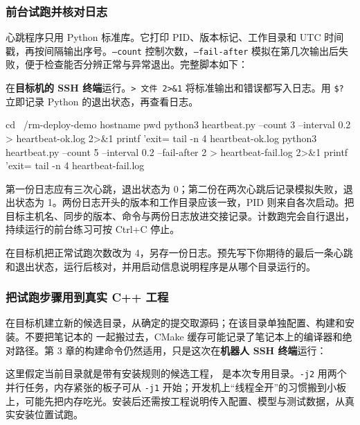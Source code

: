 \subsubsection{前台试跑并核对日志}
\label{sec:deploy-first-log}

心跳程序只用 Python 标准库。它打印 PID、版本标记、工作目录和 UTC 时间戳，再按间隔输出序号。\texttt{--count} 控制次数，\texttt{--fail-after} 模拟在第几次输出后失败，便于检查能否分辨正常与异常退出。完整脚本如下：



\begin{example}
在\textbf{目标机的 SSH 终端}运行。\texttt{> 文件 2>\&1} 将标准输出和错误都写入日志。用 \texttt{\$?} 立即记录 Python 的退出状态，再查看日志。

\begin{tbash}
cd ~/rm-deploy-demo
hostname
pwd
python3 heartbeat.py --count 3 --interval 0.2 > heartbeat-ok.log 2>&1
printf 'exit=%
tail -n 4 heartbeat-ok.log
python3 heartbeat.py --count 5 --interval 0.2 --fail-after 2 > heartbeat-fail.log 2>&1
printf 'exit=%
tail -n 4 heartbeat-fail.log
\end{tbash}

第一份日志应有三次心跳，退出状态为 0；第二份在两次心跳后记录模拟失败，退出状态为 1。两份日志开头的版本和工作目录应该一致，PID 则来自各次启动。把目标主机名、同步的版本、命令与两份日志放进交接记录。计数跑完会自行退出，持续运行的前台练习可按 Ctrl+C 停止。
\end{example}

\begin{exercise}\label{ex:deploy-first-log}
在目标机把正常试跑次数改为 4，另存一份日志。预先写下你期待的最后一条心跳和退出状态，运行后核对，并用启动信息说明程序是从哪个目录运行的。
\end{exercise}

\subsubsection{把试跑步骤用到真实 C++ 工程}

在目标机建立新的候选目录，从确定的提交取源码；在该目录单独配置、构建和安装。不要把笔记本的  一起搬过去，CMake 缓存可能记录了笔记本上的编译器和绝对路径。第 3 章的构建命令仍然适用，只是这次在\textbf{机器人 SSH 终端}运行：
这里假定当前目录就是带有安装规则的候选工程， 是本次专用目录。\texttt{-j2} 用两个并行任务，内存紧张的板子可从 \texttt{-j1} 开始；开发机上“线程全开”的习惯搬到小板上，可能先把内存吃光。安装后还需按工程说明传入配置、模型与测试数据，从真实安装位置试跑。

